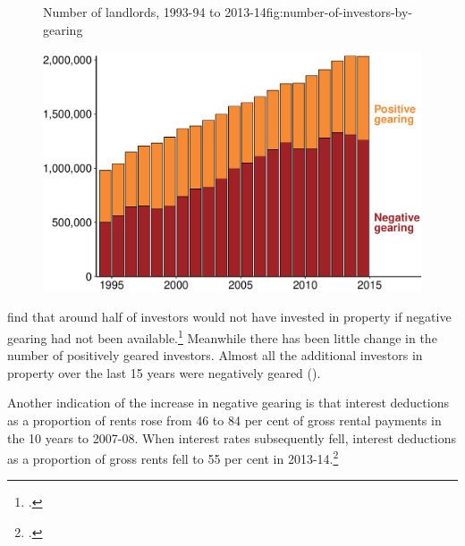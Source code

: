 \documentclass{grattanAlpha}\usepackage[]{graphicx}\usepackage[]{color}
\begin{document}
\begin{figure}
%
{Number of landlords, 1993-94 to 2013-14}{fig:number-of-investors-by-gearing}

\includegraphics[width=\columnwidth]{CGT-NG-atlas//number-of-investors-by-gearing-1}
\end{figure}

\textcite{seelig2009understanding} find that around half of investors would not have invested in property if negative gearing had not been available.\footcite[][63]{seelig2009understanding} 
Meanwhile there has been little change in the number of positively geared investors. Almost all the additional investors in property over the last 15 years were negatively geared ().

Another indication of the increase in negative gearing is that interest deductions as a proportion of rents rose from 46 to 84 per cent of gross rental payments in the 10 years to 2007-08. 
When interest rates subsequently fell, interest deductions as a proportion of gross rents fell to 55 per cent in 2013-14.\footcite[][65]{Treasury2015ReThink}
\end{document}
